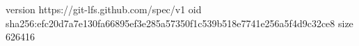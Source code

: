 version https://git-lfs.github.com/spec/v1
oid sha256:efc20d7a7e130fa66895ef3e285a57350f1c539b518e7741e256a5f4d9c32ce8
size 626416
